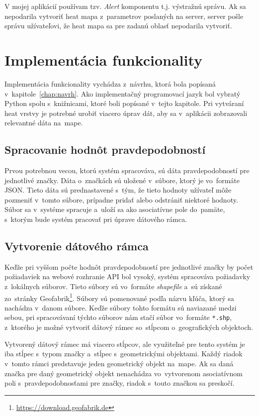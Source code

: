 V mojej aplikácií používam tzv. \emph{Alert} komponentu t.j. výstražnú správu. Ak sa nepodarila vytvoriť heat mapa z~parametrov poslaných na server, server pošle správu užívateľovi, že heat mapa sa pre zadanú oblasť nepodarila vytvoriť.


\section{Implementácia funkcionality}
Implementácia funkcionality vychádza z~návrhu, ktorá bola popísaná v~kapitole~\ref{chap:navrh}. Ako implementačný programovací jazyk bol vybratý Python spolu s~knižnicami, ktoré boli popísané v~tejto kapitole. Pri vytváraní heat vrstvy je potrebné urobiť viacero úprav dát, aby sa v~aplikácii zobrazovali relevantné dáta na~mape.

\subsection*{Spracovanie hodnôt pravdepodobností}
Prvou potrebnou vecou, ktorú systém spracováva, sú dáta pravdepodobností pre jednotlivé značky. Dáta o~značkách sú uložené v~súbore, ktorý je vo~formáte JSON. Tieto dáta sú prednastavené s~tým, že tieto hodnoty užívateľ môže pozmeniť v~tomto súbore, prípadne pridať alebo odstrániť niektoré hodnoty. Súbor sa v~systéme spracuje a~uloží sa ako asociatívne pole do~pamäte, s~ktorým bude systém pracovať pri úprave dátového rámca.

\subsection*{Vytvorenie dátového rámca}
Keďže pri vyššom počte hodnôt pravdepodobností pre jednotlivé značky by počet požiadaviek na webové rozhranie API bol vysoký, systém spracováva požiadavky z~lokálnych súborov. Tieto súbory sú vo~formáte \emph{shapefile} a~sú získané zo~stránky Geofabrik\footnote{\url{https://download.geofabrik.de}}. Súbory sú pomenované podľa názvu kľúča, ktorý sa nachádza v~danom súbore. Keďže súbory tohto formátu sú naviazané medzi sebou, pri spracovávaní týchto súborov nám stačí súbor vo~formáte \texttt{*.shp}, z~ktorého je možné vytvoriť dátový rámec so~stĺpcom o~geografických objektoch.

Vytvorený dátový rámec má viacero stĺpcov, ale využiteľné pre tento systém je iba stĺpec s~typom značky a~stĺpec s~geometrickými objektami. Každý riadok v~tomto rámci predstavuje jeden geometrický objekt na~mape. Ak sa daná značka pre daný geometrický objekt nenachádza vo~vytvorenom asociatívnom poli s~pravdepodobnosťami pre značky, riadok s~touto značkou sa preskočí.

